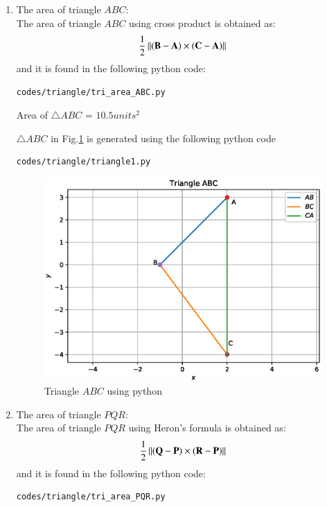 \renewcommand{\theequation}{\theenumi}
\begin{enumerate}[label=\arabic*.,ref=\thesubsection.\theenumi]
\item The area of triangle $ABC$: \\
\solution The area of triangle $ABC$ using cross product is obtained as:
$$\frac{1}{2}\left\lVert(\mathbf{B}-\mathbf{A})\times(\mathbf{C}-\mathbf{A})\right\rVert$$
and it is found in the following python code:
\begin{lstlisting}
codes/triangle/tri_area_ABC.py
\end{lstlisting} 

Area of $\triangle{ABC}$ = $10.5 units^2$

$\triangle{ABC}$ in Fig.\ref{fig:triangle_1}  is generated using the following python code
\begin{lstlisting}
codes/triangle/triangle1.py
\end{lstlisting}
\begin{figure}[!ht]
\centering
\includegraphics[width=\columnwidth]{./codes/triangle/triangle1.eps}
\caption{Triangle $ABC$ using python}
\label{fig:triangle_1}
\end{figure} 

\item The area of triangle $PQR$: \\
\solution The area of triangle $PQR$ using Heron's formula is obtained as:
$$\frac{1}{2}\left\lVert(\mathbf{Q}-\mathbf{P})\times(\mathbf{R}-\mathbf{P})\right\rVert$$
and it is found in the following python code:
\begin{lstlisting}
codes/triangle/tri_area_PQR.py
\end{lstlisting} 


\end{enumerate}
